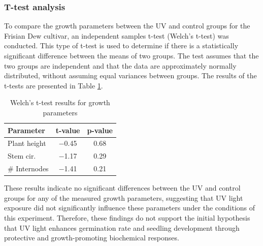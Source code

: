 \subsubsection{T-test analysis}

To compare the growth parameters between the UV and control groups for the Frisian Dew cultivar, an independent samples t-test (Welch's t-test) was conducted. This type of t-test is used to determine if there is a statistically significant difference between the means of two groups. The test assumes that the two groups are independent and that the data are approximately normally distributed, without assuming equal variances between groups. The results of the t-tests are presented in Table \ref{tab:t-test_results}.

\begin{table}[H]
    \caption{Welch's t-test results for growth parameters}
    \label{tab:t-test_results}
    \begin{tabularx}{\linewidth}{lcc}
        \toprule
        \textbf{Parameter} & \textbf{t-value} & \textbf{p-value} \\
        \midrule
        Plant height & \num[mode=text]{-0.45} & \num[mode=text]{0.68} \\
        Stem cir. & \num[mode=text]{-1.17} & \num[mode=text]{0.29} \\
        \# Internodes & \num[mode=text]{-1.41} & \num[mode=text]{0.21} \\
        \bottomrule
    \end{tabularx}
\end{table}

These results indicate no significant differences between the UV and control groups for any of the measured growth parameters, suggesting that UV light exposure did not significantly influence these parameters under the conditions of this experiment. Therefore, these findings do not support the initial hypothesis that UV light enhances germination rate and seedling development through protective and growth-promoting biochemical responses.